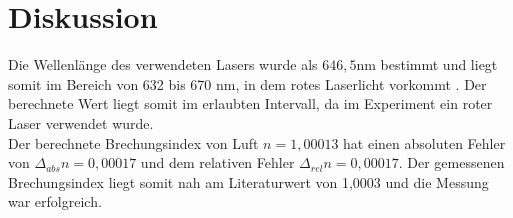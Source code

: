 \section{Diskussion}
\label{sec:Diskussion}
Die Wellenlänge des verwendeten Lasers wurde als $ 646,5 \text{nm} $ bestimmt und liegt somit im Bereich von 632 bis 670 nm, in dem rotes Laserlicht vorkommt \cite{Wellenlaenge}.
Der berechnete Wert liegt somit im erlaubten Intervall, da im Experiment ein roter Laser verwendet wurde.\\
Der berechnete Brechungsindex von Luft $n = 1,00013$ hat einen absoluten Fehler von $\Delta_{abs}n = 0,00017$ und dem relativen Fehler $\Delta_{rel}n = 0,00017$.
Der gemessenen Brechungsindex liegt somit nah am Literaturwert von 1,0003 und die Messung war erfolgreich.